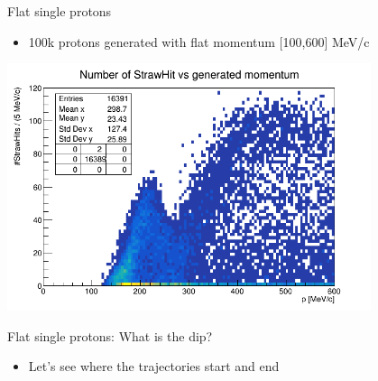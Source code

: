 \documentclass[10pt]{beamer}
\begin{document}
%
\begin{frame}{Flat single protons}
\begin{itemize}
\item 100k protons generated with flat momentum [100,600] MeV/c
\end{itemize}
\begin{center}
\includegraphics[width=0.8\textwidth]{plots/flat/all_SHvsGenp}
\end{center}
\end{frame}

%
\begin{frame}{Flat single protons: What is the dip?}
\begin{itemize}
\item Let's see where the trajectories start and end
\end{itemize}
\begin{center}
\end{center}
\end{frame}
\end{document}
